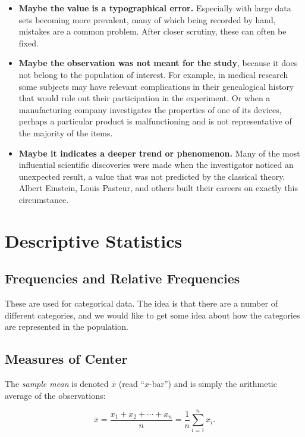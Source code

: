 \documentclass[captions=tableheading]{scrbook}
\begin{document}
\begin{itemize}
\item \textbf{Maybe the value is a typographical error.} Especially with large data sets becoming more prevalent, many of which being recorded by hand, mistakes are a common problem. After closer scrutiny, these can often be fixed.
\item \textbf{Maybe the observation was not meant for the study}, because it does not belong to the population of interest. For example, in medical research some subjects may have relevant complications in their genealogical history that would rule out their participation in the experiment. Or when a manufacturing company investigates the properties of one of its devices, perhaps a particular product is malfunctioning and is not representative of the majority of the items.
\item \textbf{Maybe it indicates a deeper trend or phenomenon.} Many of the most influential scientific discoveries were made when the investigator noticed an unexpected result, a value that was not predicted by the classical theory. Albert Einstein, Louis Pasteur, and others built their careers on exactly this circumstance.
\end{itemize}
\section{Descriptive Statistics}
\label{sec-2-3}

\label{sec:Descriptive-Statistics}
\subsection{Frequencies and Relative Frequencies}
\label{sec-2-3-1}

\label{sub:Frequencies-and-Relative}

These are used for categorical data. The idea is that there are a number of different categories, and we would like to get some idea about how the categories are represented in the population. 
\subsection{Measures of Center}
\label{sec-2-3-2}

\label{sub:Measures-of-Center}

The \emph{sample mean} is denoted \(\overline{x}\) (read ``\(x\)-bar'') and is simply the arithmetic average of the observations:

\begin{equation} 
\overline{x}=\frac{x_{1}+x_{2}+\cdots+x_{n}}{n}=\frac{1}{n}\sum_{i=1}^{n}x_{i}.
\end{equation}
\end{document}
